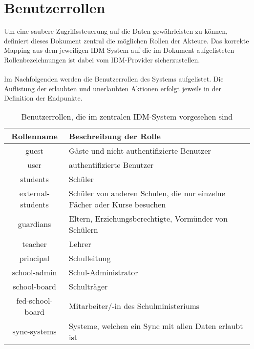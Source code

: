 \section{Benutzerrollen}
Um eine saubere Zugriffssteuerung auf die Daten gewährleisten zu können, definiert dieses Dokument zentral die möglichen Rollen der Akteure. 
Das korrekte Mapping aus dem jeweiligen IDM-System auf die im Dokument aufgelisteten Rollenbezeichnungen ist dabei vom IDM-Provider sicherzustellen.\\
\\
Im Nachfolgenden werden die Benutzerrollen des Systems aufgelistet. 
Die Auflistung der erlaubten und unerlaubten Aktionen erfolgt jeweils in der Definition der Endpunkte.


\begin{table}[htb]
	\begin{tabularx}{\textwidth}{|c|X|}
		\hline
\textbf{Rollenname} & \textbf{Beschreibung der Rolle} \\ \hline
guest & Gäste und nicht authentifizierte Benutzer \\ \hline
user & authentifizierte Benutzer \\ \hline
students & Schüler \\ \hline
external-students & Schüler von anderen Schulen, die nur einzelne Fächer oder Kurse besuchen \\ \hline
guardians & Eltern, Erziehungsberechtigte, Vormünder von Schülern \\ \hline
teacher & Lehrer \\ \hline
principal & Schulleitung \\ \hline
school-admin & Schul-Administrator \\ \hline
school-board & Schulträger \\ \hline
fed-school-board & Mitarbeiter/-in des Schulministeriums \\ \hline
sync-systems & Systeme, welchen ein Sync mit allen Daten erlaubt ist \\ \hline

	\end{tabularx}

		\caption{Benutzerrollen, die im zentralen IDM-System vorgesehen sind}
		\label{tab:intro:roles}
\end{table}